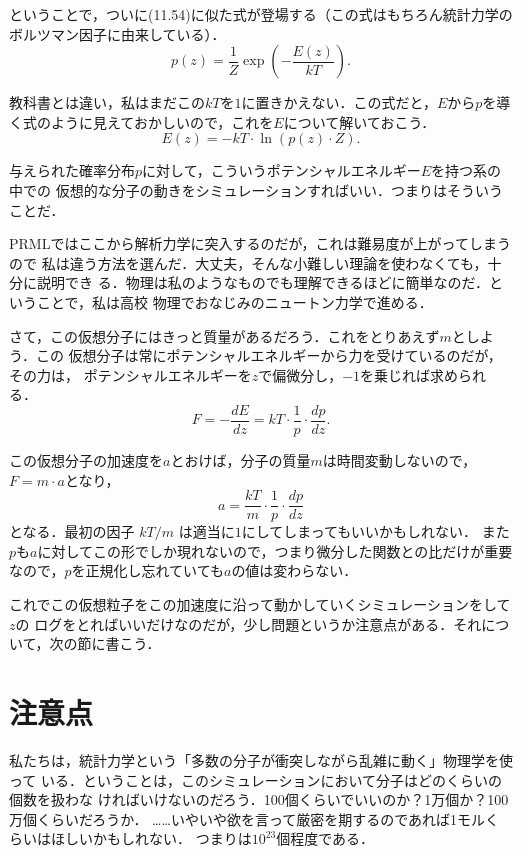 ということで，ついに(11.54)に似た式が登場する（この式はもちろん統計力学のボルツマン因子に由来している）．
%
    $$p(z) = \frac{1}{Z} \exp{\left( - \frac{E(z)}{k T} \right)}.\label{Z}$$

教科書とは違い，私はまだこの$kT$を$1$に置きかえない．この式だと，$E$から$p$を導く式のように見えておかしいので，これを$E$について解いておこう．
%
    $$E(z) = - k T \cdot \ln{\left( p(z) \cdot Z \right)}.$$

与えられた確率分布$p$に対して，こういうポテンシャルエネルギー$E$を持つ系の中での
仮想的な分子の動きをシミュレーションすればいい．つまりはそういうことだ．

  PRMLではここから解析力学に突入するのだが，これは難易度が上がってしまうので
私は違う方法を選んだ．大丈夫，そんな小難しい理論を使わなくても，十分に説明でき
る．物理は私のようなものでも理解できるほどに簡単なのだ．ということで，私は高校
物理でおなじみのニュートン力学で進める．

  さて，この仮想分子にはきっと質量があるだろう．これをとりあえず$m$としよう．この
仮想分子は常にポテンシャルエネルギーから力を受けているのだが，その力は，
ポテンシャルエネルギーを$z$で偏微分し，$-1$を乗じれば求められる．
%
    $$F = - \frac{dE}{dz} = k T \cdot \frac{1}{p} \cdot \frac{dp}{dz}.$$

  この仮想分子の加速度を$a$とおけば，分子の質量$m$は時間変動しないので， $F = m \cdot a$となり，
%
    $$a = \frac{k T}{m} \cdot \frac{1}{p} \cdot \frac{dp}{dz}$$
%
となる．最初の因子 $k T / m$ は適当に$1$にしてしまってもいいかもしれない．
また$p$も$a$に対してこの形でしか現れないので，つまり微分した関数との比だけが重要
なので，$p$を正規化し忘れていても$a$の値は変わらない．

  これでこの仮想粒子をこの加速度に沿って動かしていくシミュレーションをして$z$の
ログをとればいいだけなのだが，少し問題というか注意点がある．それについて，次の節に書こう．

\section{注意点}

  私たちは，統計力学という「多数の分子が衝突しながら乱雑に動く」物理学を使って
いる．ということは，このシミュレーションにおいて分子はどのくらいの個数を扱わな
ければいけないのだろう．100個くらいでいいのか？1万個か？100万個くらいだろうか．
……いやいや欲を言って厳密を期するのであれば1モルくらいはほしいかもしれない．
つまりは$10^{23}$個程度である．


